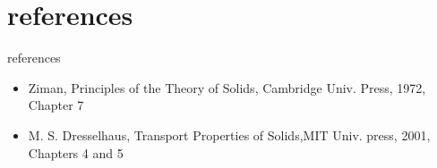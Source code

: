 \documentclass{beamer}
\begin{document}
\section{references}
\begin{frame}{references}
\begin{itemize}
\item Ziman, Principles of the Theory of Solids, Cambridge Univ. Press, 1972, Chapter 7
\item M. S. Dresselhaus, Transport Properties of Solids,MIT Univ. press, 2001, Chapters 4 and 5
\end{itemize}

\end{frame}
\end{document}
